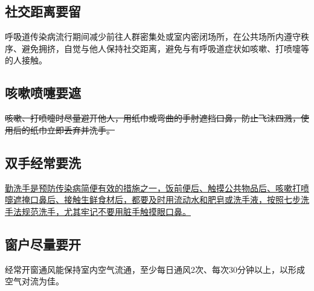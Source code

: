 \documentclass[11pt]{article}
\begin{document}
\begin{sloppypar}
    \subsection{社交距离要留}  
    \begin{flushright}
        呼吸道传染病流行期间减少前往人群密集处或室内密闭场所，在公共场所内遵守秩序、避免拥挤，自觉与他人保持社交距离，避免与有呼吸道症状如咳嗽、打喷嚏等的人接触。
    \end{flushright} 
    
    \subsection{咳嗽喷嚏要遮} 
    \sout{咳嗽、打喷嚏时尽量避开他人，用纸巾或弯曲的手肘遮挡口鼻，防止飞沫四溅，使用后的纸巾立即丢弃并洗手。}
    \subsection{双手经常要洗} 
    \uline{勤洗手是预防传染病简便有效的措施之一，饭前便后、触摸公共物品后、咳嗽打喷嚏遮掩口鼻后、接触生鲜食材后，都要及时用流动水和肥皂或洗手液，按照七步洗手法规范洗手，尤其牢记不要用脏手触摸眼口鼻。}
    \subsection{窗户尽量要开} 
    经常开窗通风能保持室内空气流通，至少每日通风2次、每次30分钟以上，以形成空气对流为佳。  
\end{sloppypar}
\end{document}

